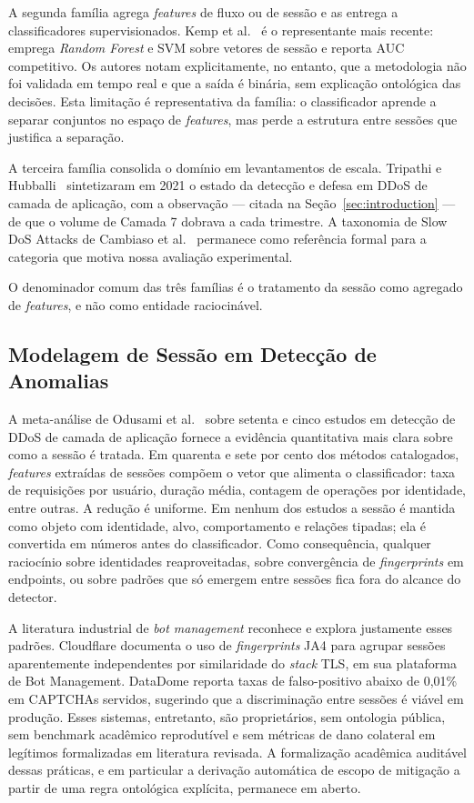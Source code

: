 \documentclass[preprint,12pt]{elsarticle}
\begin{document}
A segunda família agrega \emph{features} de fluxo ou de sessão e as entrega a classificadores supervisionados. Kemp et al.~\cite{kemp2023approach} é o representante mais recente: emprega \emph{Random Forest} e SVM sobre vetores de sessão e reporta AUC competitivo. Os autores notam explicitamente, no entanto, que a metodologia não foi validada em tempo real e que a saída é binária, sem explicação ontológica das decisões. Esta limitação é representativa da família: o classificador aprende a separar conjuntos no espaço de \emph{features}, mas perde a estrutura entre sessões que justifica a separação.

A terceira família consolida o domínio em levantamentos de escala. Tripathi e Hubballi~\cite{tripathi2021application} sintetizaram em 2021 o estado da detecção e defesa em DDoS de camada de aplicação, com a observação --- citada na Seção~\ref{sec:introduction} --- de que o volume de Camada 7 dobrava a cada trimestre. A taxonomia de Slow DoS Attacks de Cambiaso et al.~\cite{cambiaso2013slowdos} permanece como referência formal para a categoria que motiva nossa avaliação experimental.

O denominador comum das três famílias é o tratamento da sessão como agregado de \emph{features}, e não como entidade raciocinável.

\subsection{Modelagem de Sessão em Detecção de Anomalias}
\label{sec:related:session}

A meta-análise de Odusami et al.~\cite{odusami2020survey} sobre setenta e cinco estudos em detecção de DDoS de camada de aplicação fornece a evidência quantitativa mais clara sobre como a sessão é tratada. Em quarenta e sete por cento dos métodos catalogados, \emph{features} extraídas de sessões compõem o vetor que alimenta o classificador: taxa de requisições por usuário, duração média, contagem de operações por identidade, entre outras. A redução é uniforme. Em nenhum dos estudos a sessão é mantida como objeto com identidade, alvo, comportamento e relações tipadas; ela é convertida em números antes do classificador. Como consequência, qualquer raciocínio sobre identidades reaproveitadas, sobre convergência de \emph{fingerprints} em endpoints, ou sobre padrões que só emergem entre sessões fica fora do alcance do detector.

A literatura industrial de \emph{bot management} reconhece e explora justamente esses padrões. Cloudflare documenta o uso de \emph{fingerprints} JA4 para agrupar sessões aparentemente independentes por similaridade do \emph{stack} TLS, em sua plataforma de Bot Management. DataDome reporta taxas de falso-positivo abaixo de 0{,}01\% em CAPTCHAs servidos, sugerindo que a discriminação entre sessões é viável em produção. Esses sistemas, entretanto, são proprietários, sem ontologia pública, sem benchmark acadêmico reprodutível e sem métricas de dano colateral em legítimos formalizadas em literatura revisada. A formalização acadêmica auditável dessas práticas, e em particular a derivação automática de escopo de mitigação a partir de uma regra ontológica explícita, permanece em aberto.
\end{document}
